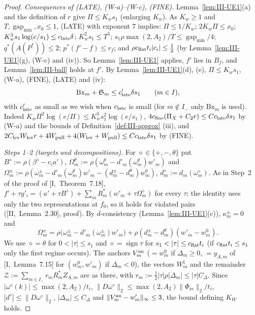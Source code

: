 \documentclass[10pt]{amsart}
\theoremstyle{definition}
\theoremstyle{remark}
\newcommand{\sgn}{\operatorname{sign}}
\newcommand{\gap}{\operatorname{gap}}
\begin{document}
\begin{proof}
\emph{Consequences of (LATE), (W-a)--(W-c), (FINE).}  Lemma~\ref{lem:III-UE1}(a)
and the definition of $r$ give $\Pi\le K_ws_1$ (enlarging $K_w$).  As $K_w\ge1$
and $T,\gap_{\min},x_0\le1$, (LATE) with exponent $7$ implies:
$\Pi\le1/K_w$; $2K_w\Pi\le x_0$; $K_w^3s_1\log(e/s_1)\le c_{\rm late}\delta$;
$K_w^2s_1\le T^5$; $s_1\rho\max(2,A_2)/T\le\gap_{\min}/4$; $q^*(A(P^*))\le2$;
$p^*(f'-f)\le r_f$; and $\rho c_{\rm flat}t_i|c_i|\le\frac12$ (by
Lemma~\ref{lem:III-UE1}(g), (W-c) and (iv)).  So Lemma~\ref{lem:III-UE1}
applies, $f'$ lies in $B_f$, and Lemma~\ref{lem:III-ball} holds at $f'$.  By
Lemma~\ref{lem:III-UE1}(d), (e), $\Pi\le K_ws_1$, (W-a), (FINE), (LATE) and (iv):
\begin{equation}\label{eq:III-BxS}
 \mathrm{Bx}_m+\mathfrak S_m\le c'_{\rm late}\delta s_1\qquad(m\in I),
\end{equation}
with $c'_{\rm late}$ as small as we wish when $c_{\rm late}$ is small (for
$m\notin I_-$ only $\mathrm{Bx}_m$ is used).  Indeed
$K_w\Pi^2\log(e/\Pi)\le K_w^3s_1^2\log(e/s_1)$, $4c_{\rm fine}(\Pi_X+C_2r)\le
Cc_{\rm late}\delta s_1$ by (W-a) and the bounds of Definition~\ref{def:III-approx}
(iii), and $2C_{\rm lev}W_{\rm lev}r+4W_{\rm pull}+4(W_{\rm lev}+W_{\rm pull})\le
Cc_{\rm late}\delta s_1$ by (FINE).

\emph{Steps 1--2 (targets and decompositions).}  For $\diamond\in\{+,-,\theta\}$
put $B^\diamond:=\rho(\beta^\diamond-c_ia')$, $\Omega^\theta_m:=\rho(\omega^\theta_m-
d'_m(\omega^\theta_m)w'_m)$ and $\Omega^\pm_m:=\rho(\omega^\pm_m-d'_m(\omega^\theta_m)
w'_m-(d^\pm_m-d^\theta_m)w^0_m)$, $d^\diamond_m:=d_m(\omega^\diamond_m)$.  As in
Step~2 of the proof of [I,~Theorem~7.18], $f'+\tau g'_i=(a'+\tau B^\diamond)+
\sum_mR_m^*(w'_m+\tau\Omega^\diamond_m)$ for every $\tau$; the identity uses only
the two representations at $f_0$, so it holds for violated pairs
([II,~Lemma~2.30], proof).  By $d$-consistency (Lemma~\ref{lem:III-UE1}(c)),
$\kappa^\pm_m=0$ and
\[
 \Omega^\pm_m=\rho\big(\omega^\pm_m-d'_m(\omega^\pm_m)w'_m\big)+\rho(d^\pm_m-
 d^\theta_m)(w'_m-w^0_m).
\]
We use $\diamond=\theta$ for $0<|\tau|\le s_1$ and $\diamond=\sgn\tau$ for
$s_1<|\tau|\le c_{\rm flat}t_i$ (if $c_{\rm flat}t_i\le s_1$ only the first
regime occurs).  The anchors $V^{\rm an}_m$ ($=w^0_m$ if $\Delta_m\ge0$, $=y_{A,m}$
of [I,~Lemma~7.15] for $(w^0_m,w'_m)$ if $\Delta_m<0$), the vectors $W^\natural_m$
and the remainder $\mathcal Z:=\sum_{m\in I_-}r_mR_m^*Z_{A,m}$ are as there, with
$r_m:=\frac12|\tau|\rho|\Delta_m|\le|\tau|C_\Delta$.  Since
$|\omega^\diamond(k)|\le\max(2,A_2)/t_i$, $\|D\omega^\diamond\|_2\le\max(2,A_2)
\|\Phi_m\|_2/t_i$, $|d^\diamond|\le\|D\omega^\diamond\|_2$, $|\Delta_m|\le
C_\Delta$ and $\|V^{\rm an}_m-w'_m\|_\infty\le3$, the bound defining $K_W$ holds.


\end{proof}
\end{document}

